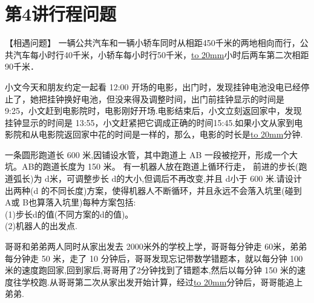 \section{第4讲\quad 行程问题}

\item {
    【相遇问题】
    一辆公共汽车和一辆小轿车同时从相距450千米的两地相向而行，公共汽车每小时行40千米，小轿车每小时行50千米，\underline{\hbox to 20mm{}}小时后两车第二次相距90千米．
    \vspace{2cm}
}

\item {
    小文今天和朋友约定一起看 12:00 开场的电影，出门时，发现挂钟电池没电已经停止了，她把挂钟换好电池，但没来得及调整时间，出门前挂钟显示的时间是 9:25，小文赶到电影院时，电影刚好开场.电影结束后，小文立刻返回家中，发现挂钟显示的时间是 13:55，小文赶紧把它调成正确的时间15:45.如果小文从家到电影院和从电影院返回家中花的时间是一样的，那么，电影的时长是\underline{\hbox to 20mm{}}分钟.
    \vspace{2cm}
}

\item {
    一条圆形跑道长 600 米,因铺设水管，其中跑道上 AB 一段被挖开，形成一个大坑。AB的跑道长度为 150 米。 有一机器人放在跑道上循环行走， 前进的步长(跑道弧长)为 d米，可调整步长 d的大小,但调后不再改变,并且 d小于 600 米.请设计出两种(d 的不同长度)方案，使得机器人不断循环，并且永远不会落入坑里(碰到 A或 B也算落入坑里)每种方案包括:\\
    (1)步长d的值(不同方案的d的值)。\\
    (2)机器人的出发点.
    \vspace{2cm}
}

\item {
    哥哥和弟弟两人同时从家出发去 2000米外的学校上学，哥哥每分钟走 60米，弟弟每分钟走 50 米，走了 10 分钟后，哥哥发现忘记带数学错题本，就以每分钟 100 米的速度跑回家,回到家后,哥哥用了2分钟找到了错题本,然后以每分钟 150 米的速度往学校跑.从哥哥第二次从家出发开始计算，经过\underline{\hbox to 20mm{}}分钟后，哥哥能追上弟弟.
    \vspace{2cm}
}

